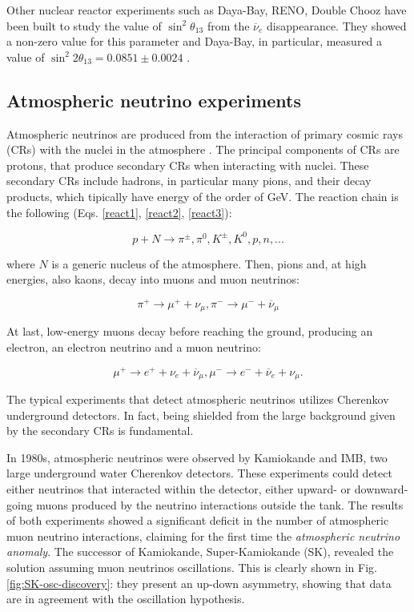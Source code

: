 Other nuclear reactor experiments such as Daya-Bay, RENO, Double Chooz have been built to study the value of $\sin^2\theta_{13}$ from the $\overline{\nu}_e$ disappearance. They showed a non-zero value for this parameter and Daya-Bay, in particular, measured a value of $\sin^2 2\theta_{13} = 0.0851 \pm 0.0024$ \cite{daya-bay}.

\subsection{Atmospheric neutrino experiments}
Atmospheric neutrinos are produced from the interaction of primary cosmic rays (CRs) with the nuclei in the atmosphere \cite{giunti_kim_fundamental}. The principal components of CRs are protons, that  produce secondary CRs when interacting with nuclei. These secondary CRs include hadrons, in particular many pions, and their decay products, which tipically have energy of the order of GeV. The reaction chain is the following (Eqs. \ref{react1}, \ref{react2}, \ref{react3}):

\begin{equation}
\label{react1}
    p + N \rightarrow \pi^\pm, \pi^0, K^\pm, K^0, p, n, ...
\end{equation}

where $N$ is a generic nucleus of the atmosphere. Then, pions and, at high energies, also kaons, decay into muons and muon neutrinos:

\begin{equation}
\label{react2}
    \pi^+ \rightarrow \mu^+ + \nu_\mu, \pi^- \rightarrow \mu^- + \overline{\nu}_\mu
\end{equation}

At last, low-energy muons decay before reaching the ground, producing an electron, an electron neutrino and a muon neutrino:

\begin{equation}
\label{react3}
    \mu^+ \rightarrow e^+ + \nu_e + \overline{\nu}_\mu, \mu^- \rightarrow e^- + \overline{\nu}_e + \nu_\mu.
\end{equation}

The typical experiments that detect atmospheric neutrinos utilizes Cherenkov underground detectors. In fact, being shielded from the large background given by the secondary CRs is fundamental.

In 1980s, atmospheric neutrinos were observed by Kamiokande and IMB, two large underground water Cherenkov detectors. These experiments could detect either neutrinos that interacted within the detector, either upward- or downward-going muons produced by the neutrino interactions outside the tank. The results of both experiments showed a significant deficit in the number of atmospheric muon neutrino interactions, claiming for the first time the \textit{atmospheric neutrino anomaly}. 
The successor of Kamiokande, Super-Kamiokande (SK), revealed the solution assuming muon neutrinos oscillations. This is clearly shown in Fig. \ref{fig:SK-osc-discovery}: they present an up-down asymmetry, showing that data are in agreement with the oscillation hypothesis.

